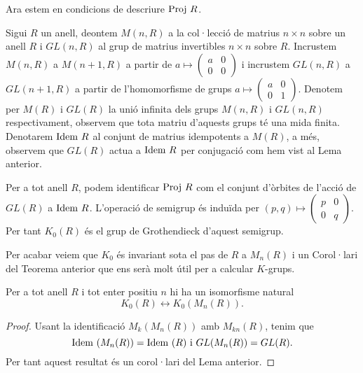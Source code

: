 Ara estem en condicions de descriure $\mathrm{Proj} \  R$.

\begin{definition} \label{incrustacio}
Sigui $R$ un anell, deontem $M(n,R)$ a la col·lecció de matrius $n\times n$ sobre un anell $R$ i $GL(n,R)$ al grup de matrius invertibles $n\times n$ sobre $R$. Incrustem $M(n,R)$ a $M(n+1,R)$ a partir de $a \mapsto
 \left( \begin{matrix}
  a & 0 \\
  0 & 0
 \end{matrix} \right)$ i incrustem $GL(n,R)$ a $GL(n+1,R)$ a partir de l'homomorfisme de grups
  $a \mapsto 
 \left( \begin{matrix}
  a & 0 \\
  0 & 1
 \end{matrix} \right)$.
 Denotem per $M(R)$ i $GL(R)$ la unió infinita dels grups $M(n,R)$ i $GL(n,R)$ respectivament, observem que tota matriu d'aquests grups té una mida finita. Denotarem $\mathrm{Idem} \  R$ al conjunt de matrius idempotents a $M(R)$, a més, observem que $GL(R)$ actua a $\mathrm{Idem} \  R$ per conjugació com hem vist al Lema anterior.
\end{definition}

\begin{theorem}
Per a tot anell $R$, podem identificar $\mathrm{Proj} \  R$ com el conjunt d'òrbites de l'acció de $GL(R)$ a $\mathrm{Idem} \  R$. L'operació de semigrup és induïda per 
$
(p,q)\mapsto 
 \left( \begin{matrix}
  p & 0 \\
  0 & q
 \end{matrix} \right) .
$
Per tant $K_0(R)$ és el grup de Grothendieck d'aquest semigrup.
\end{theorem}

Per acabar veiem que $K_0$ és invariant sota el pas de $R$ a $M_n(R)$ i un Corol·lari del Teorema anterior que ens serà molt útil per a calcular $K$-grups.

\begin{theorem}
Per a tot anell $R$ i tot enter positiu $n$ hi ha un isomorfisme natural 
$$K_0(R)\leftrightarrow K_0(M_n(R)).$$
\end{theorem}
\begin{proof}
Usant la identificació $M_k(M_n(R))$ amb $M_{kn}(R)$, tenim que 
$$
\idem (M_n(R)) = \idem (R) \ \text{i} \ GL(M_n(R)) = GL(R).
$$
Per tant aquest resultat és un corol·lari del Lema anterior.
\end{proof}

